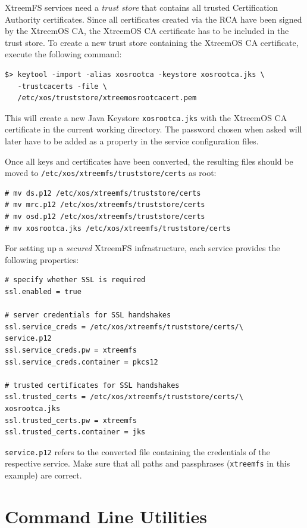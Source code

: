 \documentclass[a4paper,10pt]{book}
\begin{document}
XtreemFS services need a \textit{trust store} that contains all trusted Certification Authority certificates. Since all certificates created via the RCA have been signed by the XtreemOS CA, the XtreemOS CA certificate has to be included in the trust store. To create a new trust store containing the XtreemOS CA certificate, execute the following command:


\begin{verbatim}
$> keytool -import -alias xosrootca -keystore xosrootca.jks \
   -trustcacerts -file \
   /etc/xos/truststore/xtreemosrootcacert.pem
\end{verbatim}

This will create a new Java Keystore \texttt{xosrootca.jks} with the XtreemOS CA certificate in the current working directory. The password chosen when asked will later have to be added as a property in the service configuration files.

Once all keys and certificates have been converted, the resulting files should be moved to \texttt{/etc/xos/xtreemfs/truststore/certs} as root:


\begin{verbatim}
# mv ds.p12 /etc/xos/xtreemfs/truststore/certs
# mv mrc.p12 /etc/xos/xtreemfs/truststore/certs
# mv osd.p12 /etc/xos/xtreemfs/truststore/certs
# mv xosrootca.jks /etc/xos/xtreemfs/truststore/certs
\end{verbatim}


For setting up a \textit{secured} XtreemFS infrastructure, each service provides the following properties:


\begin{verbatim}
# specify whether SSL is required
ssl.enabled = true

# server credentials for SSL handshakes
ssl.service_creds = /etc/xos/xtreemfs/truststore/certs/\
service.p12
ssl.service_creds.pw = xtreemfs
ssl.service_creds.container = pkcs12

# trusted certificates for SSL handshakes
ssl.trusted_certs = /etc/xos/xtreemfs/truststore/certs/\
xosrootca.jks
ssl.trusted_certs.pw = xtreemfs
ssl.trusted_certs.container = jks
\end{verbatim}

\texttt{service.p12} refers to the converted file containing the credentials of the respective service. Make sure that all paths and passphrases (\texttt{xtreemfs} in this example) are correct.



\chapter{Command Line Utilities}
\end{document}
